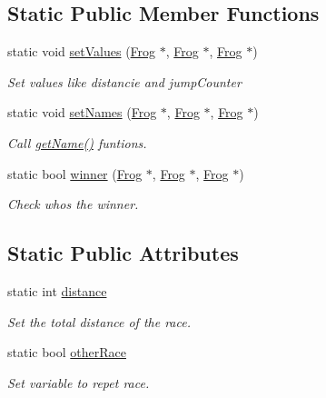 \subsection*{Static Public Member Functions}
\begin{DoxyCompactItemize}
\item 
static void \hyperlink{classFrog_a406747ce3a1b90e20a4d73a7c8e271e1}{set\+Values} (\hyperlink{classFrog}{Frog} $\ast$, \hyperlink{classFrog}{Frog} $\ast$, \hyperlink{classFrog}{Frog} $\ast$)
\begin{DoxyCompactList}\small\item\em Set values like {\itshape distancie} and {\itshape jump\+Counter} \end{DoxyCompactList}\item 
static void \hyperlink{classFrog_a9caa1655987b9fd5ee1718eb5d71243d}{set\+Names} (\hyperlink{classFrog}{Frog} $\ast$, \hyperlink{classFrog}{Frog} $\ast$, \hyperlink{classFrog}{Frog} $\ast$)
\begin{DoxyCompactList}\small\item\em Call \hyperlink{classFrog_aed2135d3c87ea38779a103904db1ac01}{get\+Name()} funtions. \end{DoxyCompactList}\item 
static bool \hyperlink{classFrog_aefca49315bbf86bf6c23e71143f43ef3}{winner} (\hyperlink{classFrog}{Frog} $\ast$, \hyperlink{classFrog}{Frog} $\ast$, \hyperlink{classFrog}{Frog} $\ast$)
\begin{DoxyCompactList}\small\item\em Check who\textquotesingle{}s the winner. \end{DoxyCompactList}\end{DoxyCompactItemize}
\subsection*{Static Public Attributes}
\begin{DoxyCompactItemize}
\item 
static int \hyperlink{classFrog_a5846a1d18091a9d5409cd7ab3a93abdf}{distance}
\begin{DoxyCompactList}\small\item\em Set the total distance of the race. \end{DoxyCompactList}\item 
static bool \hyperlink{classFrog_a3069c74fde5e33eb58c40c655b1ad8f7}{other\+Race}
\begin{DoxyCompactList}\small\item\em Set variable to repet race. \end{DoxyCompactList}\end{DoxyCompactItemize}
